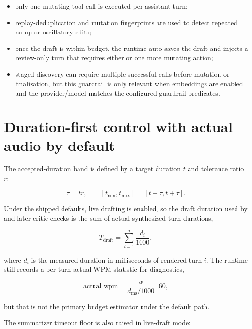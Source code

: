 \begin{itemize}
  \item only one mutating tool call is executed per assistant turn;
  \item replay-deduplication and mutation fingerprints are used to detect repeated no-op or oscillatory edits;
  \item once the draft is within budget, the runtime auto-saves the draft and injects a review-only turn that requires either  or one more mutating action;
  \item staged discovery can require multiple successful  calls before mutation or finalization, but this guardrail is only relevant when embeddings are enabled and the provider/model matches the configured guardrail predicates.
\end{itemize}

\section{Duration-first control with actual audio by default}

The accepted-duration band is defined by a target duration \(t\) and tolerance ratio \(r\):

\begin{equation}
\tau = tr, \qquad [t_{\min}, t_{\max}] = [t - \tau, t + \tau].
\label{eq:durationband}
\end{equation}

Under the shipped defaults, live drafting is enabled, so the draft duration used by  and later critic checks is the sum of actual synthesized turn durations,

\begin{equation}
T_{\mathrm{draft}} = \sum_{i=1}^{n} \frac{d_i}{1000},
\end{equation}

where \(d_i\) is the measured duration in milliseconds of rendered turn \(i\). The runtime still records a per-turn actual WPM statistic for diagnostics,

\begin{equation}
\mathrm{actual\_wpm} = \frac{w}{d_{\mathrm{ms}} / 1000} \cdot 60,
\end{equation}

but that is not the primary budget estimator under the default path.

The summarizer timeout floor is also raised in live-draft mode:

